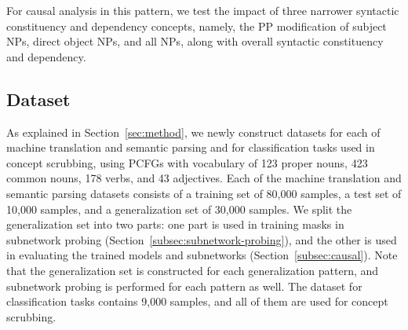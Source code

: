 For causal analysis in this pattern, we test the impact of three narrower syntactic constituency and dependency concepts, namely, the PP modification of subject NPs, direct object NPs, and all NPs, along with overall syntactic constituency and dependency.


\subsection{Dataset}
As explained in Section~\ref{sec:method}, we newly construct datasets for each of machine translation and semantic parsing and for classification tasks used in concept scrubbing, using PCFGs with vocabulary of 123 proper nouns, 423 common nouns, 178 verbs, and 43 adjectives.
Each of the machine translation and semantic parsing datasets consists of a training set of 80,000 samples, a test set of 10,000 samples, and a generalization set of 30,000 samples.
We split the generalization set into two parts:
one part is used in training masks in subnetwork probing (Section~\ref{subsec:subnetwork-probing}), and the other is used in evaluating the trained models and subnetworks (Section~\ref{subsec:causal}).
Note that the generalization set is constructed for each generalization pattern, and subnetwork probing is performed for each pattern as well.
The dataset for classification tasks contains 9,000 samples, and all of them are used for concept scrubbing.

